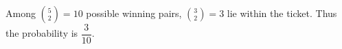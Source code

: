 Among $\binom52=10 $ possible winning pairs, $\binom32=3 $ lie within the ticket. Thus the probability is $\boxed{\dfrac{3}{10}}$.
